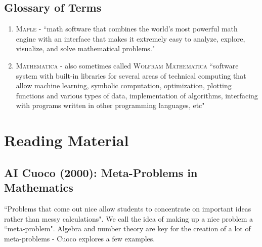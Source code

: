 \documentclass[12pt]{article}
\begin{document}
\subsection{Glossary of Terms}
\begin{enumerate}[itemsep=-2mm]
    \item \textsc{Maple} - ``math software that combines the world's most powerful math engine with an interface that makes it extremely easy to analyze, explore, visualize, and solve mathematical problems."
    \item \textsc{Mathematica} - also sometimes called \textsc{Wolfram Mathematica} ``software system with built-in libraries for several areas of technical computing that allow machine learning, symbolic computation, optimization, plotting functions and various types of data, implementation of algorithms, interfacing with programs written in other programming languages, etc"
\end{enumerate}


\pagebreak 

\section{Reading Material}

\subsection{AI Cuoco (2000): Meta-Problems in Mathematics}
``Problems that come out nice allow students to concentrate on important ideas rather than messy calculations". We call the idea of making up a nice problem a ``meta-problem". Algebra and number theory are key for the creation of a lot of meta-problems - Cuoco explores a few examples.
\end{document}
